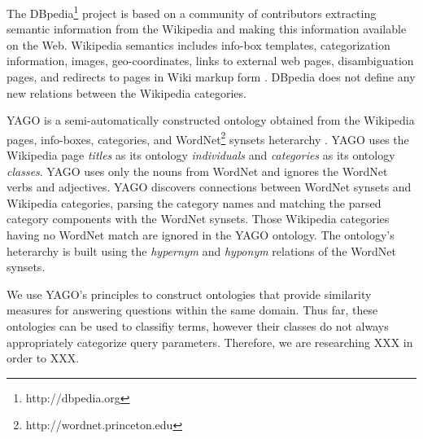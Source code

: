 
The DBpedia\footnote{http://dbpedia.org} project is based on a community of contributors extracting semantic information from the Wikipedia and making this information available on the Web.  Wikipedia semantics includes info-box templates, categorization information,  images, geo-coordinates, links to external web pages, disambiguation pages, and redirects to pages in Wiki markup form \cite{Bizer2009}.  DBpedia does not define any new relations between the Wikipedia categories.  


YAGO is a semi-automatically constructed ontology obtained from the Wikipedia pages, info-boxes, categories, and WordNet\footnote{http://wordnet.princeton.edu} synsets heterarchy \cite{Suchanek2009phd}. YAGO uses the Wikipedia page \emph{titles} as its ontology \emph{individuals} and \emph{categories} as its ontology \emph{classes}. YAGO uses only the nouns from WordNet and ignores the WordNet verbs and adjectives.  YAGO discovers connections between WordNet synsets and Wikipedia categories, parsing the category names and matching the parsed category components with the WordNet synsets. Those Wikipedia categories having no WordNet match are ignored in the YAGO ontology.  The ontology's heterarchy is built using the \textit{hypernym} and \textit{hyponym} relations of the WordNet synsets.  

We use YAGO's principles to construct ontologies that provide similarity measures for answering questions within the same domain.  Thus far, these ontologies can be used to classifiy terms, however their classes do not always appropriately categorize query parameters.  Therefore, we are researching XXX in order to XXX.%
 


